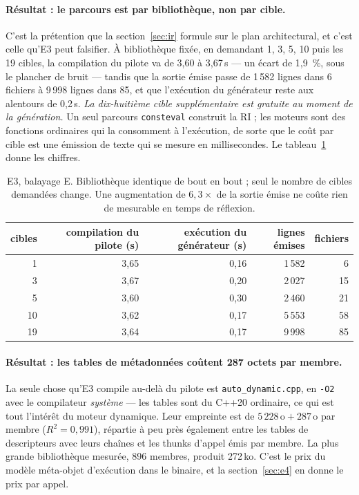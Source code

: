 \documentclass[11pt,a4paper]{article}
\newcommand{\code}[1]{\texttt{\small #1}}
\begin{document}
\paragraph{Résultat : le parcours est par bibliothèque, non par cible.} C'est la
prétention que la section~\ref{sec:ir} formule sur le plan architectural, et
c'est celle qu'E3 peut falsifier. À bibliothèque fixée, en demandant 1, 3, 5, 10
puis les 19 cibles, la compilation du pilote va de 3,60 à 3,67\,s --- un écart de
1,9~\%, sous le plancher de bruit --- tandis que la sortie émise passe de
1\,582 lignes dans 6 fichiers à 9\,998 lignes dans 85, et que l'exécution du
générateur reste aux alentours de 0,2\,s. \emph{La dix-huitième cible
supplémentaire est gratuite au moment de la génération.} Un seul parcours
\code{consteval} construit la RI ; les moteurs sont des fonctions ordinaires qui
la consomment à l'exécution, de sorte que le coût par cible est une émission de
texte qui se mesure en millisecondes. Le tableau~\ref{tab:e3} donne les chiffres.

\begin{table}[h]
\centering\small
\begin{tabular}{rrrrr}
\toprule
cibles & compilation du pilote (s) & exécution du générateur (s) & lignes émises & fichiers \\
\midrule
1  & 3,65 & 0,16 & 1\,582 & 6 \\
3  & 3,67 & 0,20 & 2\,027 & 15 \\
5  & 3,60 & 0,30 & 2\,460 & 21 \\
10 & 3,62 & 0,17 & 5\,553 & 58 \\
19 & 3,64 & 0,17 & 9\,998 & 85 \\
\bottomrule
\end{tabular}
\caption{E3, balayage E. Bibliothèque identique de bout en bout ; seul le nombre
de cibles demandées change. Une augmentation de $6{,}3\times$ de la sortie émise
ne coûte rien de mesurable en temps de réflexion.}
\label{tab:e3}
\end{table}

\paragraph{Résultat : les tables de métadonnées coûtent 287 octets par membre.}
La seule chose qu'E3 compile au-delà du pilote est \code{auto\_dynamic.cpp}, en
\code{-O2} avec le compilateur \emph{système} --- les tables sont du C++20
ordinaire, ce qui est tout l'intérêt du moteur dynamique. Leur empreinte est de
$5\,228\,\text{o} + 287\,\text{o}$ par membre ($R^2 = 0{,}991$), répartie à peu
près également entre les tables de descripteurs avec leurs chaînes et les thunks
d'appel émis par membre. La plus grande bibliothèque mesurée, 896 membres,
produit 272\,ko. C'est le prix du modèle méta-objet d'exécution dans le binaire,
et la section~\ref{sec:e4} en donne le prix par appel.
\end{document}
